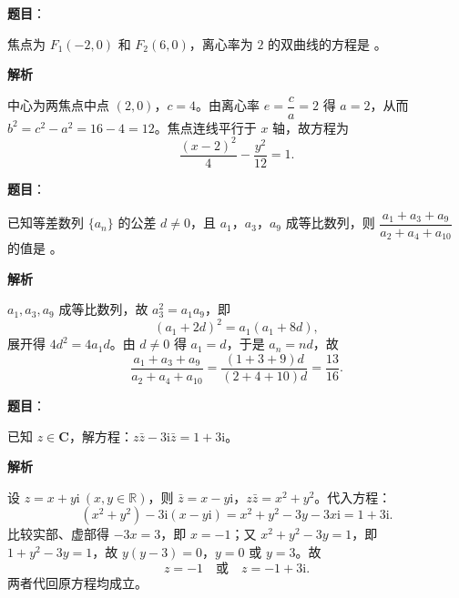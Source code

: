 \begin{answer}

\textbf{题目}：

焦点为 \(F_1(-2,0)\) 和 \(F_2(6,0)\)，离心率为 \(2\) 的双曲线的方程是 \underline{\qquad}。

\textbf{解析}

中心为两焦点中点 \((2,0)\)，\(c=4\)。由离心率 \(e=\dfrac ca=2\) 得 \(a=2\)，从而 \(b^2=c^2-a^2=16-4=12\)。焦点连线平行于 \(x\) 轴，故方程为
\nopagebreak[4]
\[
\frac{(x-2)^2}{4}-\frac{y^2}{12}=1.
\]


\end{answer}
\begin{answer}

\textbf{题目}：

已知等差数列 \(\{a_n\}\) 的公差 \(d\neq0\)，且 \(a_1\)，\(a_3\)，\(a_9\) 成等比数列，则 \(\dfrac{a_1+a_3+a_9}{a_2+a_4+a_{10}}\) 的值是 \underline{\qquad}。

\textbf{解析}

\(a_1,a_3,a_9\) 成等比数列，故 \(a_3^2=a_1a_9\)，即
\nopagebreak[4]
\[
(a_1+2d)^2=a_1(a_1+8d),
\]
展开得 \(4d^2=4a_1d\)。由 \(d\neq0\) 得 \(a_1=d\)，于是 \(a_n=nd\)，故
\nopagebreak[4]
\[
\frac{a_1+a_3+a_9}{a_2+a_4+a_{10}}
=\frac{(1+3+9)d}{(2+4+10)d}
=\frac{13}{16}.
\]


\end{answer}
\begin{answer}

\textbf{题目}：

已知 \(z\in\mathbf{C}\)，解方程：\(z\bar z-3\mathrm{i}\bar z=1+3\mathrm{i}\)。

\textbf{解析}

设 \(z=x+y\mathrm{i}\ (x,y\in\mathbb R)\)，则 \(\bar z=x-y\mathrm{i}\)，\(z\bar z=x^2+y^2\)。代入方程：
\nopagebreak[4]
\[
(x^2+y^2)-3\mathrm{i}(x-y\mathrm{i})
=x^2+y^2-3y-3x\mathrm{i}=1+3\mathrm{i}.
\]
比较实部、虚部得 \(-3x=3\)，即 \(x=-1\)；又 \(x^2+y^2-3y=1\)，即 \(1+y^2-3y=1\)，故 \(y(y-3)=0\)，\(y=0\) 或 \(y=3\)。故
\nopagebreak[4]
\[
z=-1\quad\text{或}\quad z=-1+3\mathrm{i}.
\]
两者代回原方程均成立。


\end{answer}

